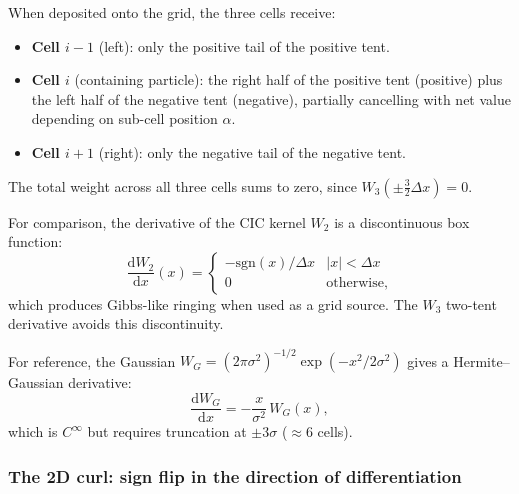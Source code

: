 \documentclass[11pt,a4paper]{article}
\newcommand{\dd}{\mathrm{d}}
\begin{document}
When deposited onto the grid, the three cells receive:
\begin{itemize}
  \item \textbf{Cell $i-1$} (left): only the positive tail of the positive tent.
  \item \textbf{Cell $i$} (containing particle): the right half of the positive tent (positive) plus the left half of the negative tent (negative), partially cancelling with net value depending on sub-cell position $\alpha$.
  \item \textbf{Cell $i+1$} (right): only the negative tail of the negative tent.
\end{itemize}
The total weight across all three cells sums to zero, since $W_3(\pm\tfrac{3}{2}\Delta x)=0$.

For comparison, the derivative of the CIC kernel $W_2$ is a discontinuous box function:
\begin{equation}
  \frac{\dd W_2}{\dd x}(x) = \begin{cases}
    -\mathrm{sgn}(x)/\Delta x & |x| < \Delta x \\
    0                         & \text{otherwise,}
  \end{cases}
\end{equation}
which produces Gibbs-like ringing when used as a grid source.  The $W_3$ two-tent derivative avoids this discontinuity.

For reference, the Gaussian $W_G = (2\pi\sigma^2)^{-1/2}\exp(-x^2/2\sigma^2)$ gives a Hermite--Gaussian derivative:
\begin{equation}
  \frac{\dd W_G}{\dd x} = -\frac{x}{\sigma^2}\,W_G(x),
\end{equation}
which is $C^\infty$ but requires truncation at $\pm 3\sigma$ ($\approx 6$ cells).

\subsubsection*{The 2D curl: sign flip in the direction of differentiation}
\end{document}
